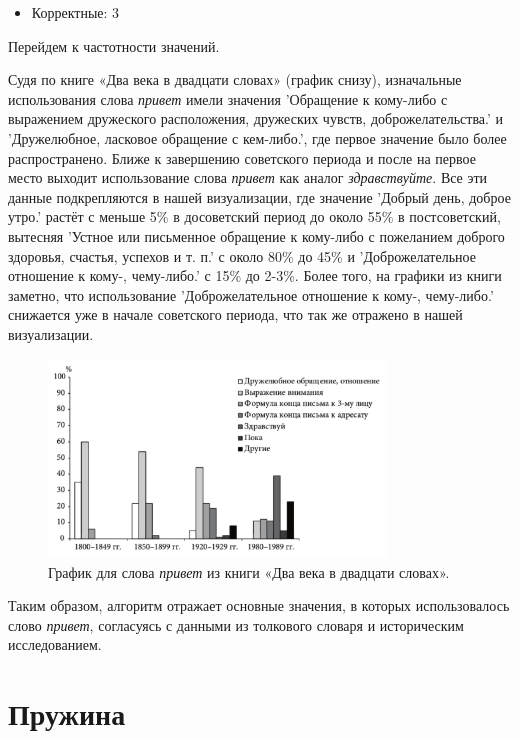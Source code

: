 \begin{itemize}
    \item Корректные: 3
\end{itemize}

Перейдем к частотности значений.

Судя по книге «Два века в двадцати словах» (график снизу), изначальные использования слова \textit{привет}
имели значения ’Обращение к кому-либо с выражением дружеского расположения,
дружеских чувств, доброжелательства.’ и ’Дружелюбное, ласковое обращение с кем-либо.’,
где первое значение было более распространено.
Ближе к завершению советского периода и после на первое место выходит использование
слова \textit{привет} как аналог \textit{здравствуйте}.
Все эти данные подкрепляются в нашей визуализации, где значение ’Добрый день, доброе утро.’
растёт с меньше 5\% в досоветский период до около 55\% в постсоветский, вытесняя
’Устное или письменное обращение к кому-либо с пожеланием доброго здоровья, счастья, успехов и т. п.’
с около 80\% до 45\% и ’Доброжелательное отношение к кому-, чему-либо.’ с 15\% до 2-3\%.
Более того, на графики из книги заметно, что использование ’Доброжелательное отношение к кому-, чему-либо.’
снижается уже в начале советского периода, что так же отражено в нашей визуализации.

\begin{figure}[H]
    \centering %
    \includegraphics[width=0.8\textwidth]{img/book/privet/all}
    \caption{График для слова \textit{привет} из книги «Два века в двадцати словах».}
\end{figure}

Таким образом, алгоритм отражает основные значения, в которых использовалось
слово \textit{привет}, согласуясь с данными из толкового словаря и историческим исследованием.

\section*{Пружина}

